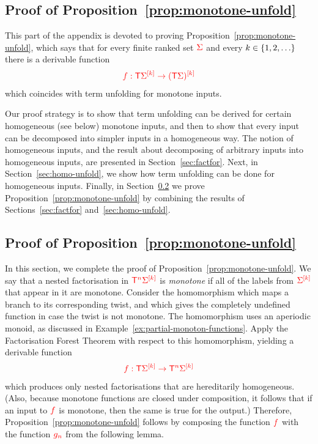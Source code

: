 \subsection{Proof of Proposition~\ref{prop:monotone-unfold}}
This part of the appendix is devoted to proving Proposition~\ref{prop:monotone-unfold}, which says that  for  every finite ranked set $\rSigma$ and every $k \in \set{1,2,\ldots}$ there is a derivable function 
    \begin{align*}
    \ranked{ f : \tmonad \mati k \Sigma \to \mati k {(\tmonad \Sigma)}}
    \end{align*}
    which coincides with term unfolding for monotone inputs.


Our proof strategy is to show that term unfolding can be derived for certain homogeneous (see below) monotone inputs, and then to show that every input can be decomposed into simpler inputs in a homogeneous way. The notion of homogeneous inputs, and the result about  decomposing of arbitrary inputs into homogeneous inputs, are presented in Section~\ref{sec:factfor}. Next, in Section~\ref{sec:homo-unfold}, we show how term unfolding can be done for homogeneous inputs. Finally, in Section~\ref{sec:monotone-unfold-proof} we prove Proposition~\ref{prop:monotone-unfold} by combining  the results of Sections~\ref{sec:factfor} and~\ref{sec:homo-unfold}.




\subsection{Proof of Proposition~\ref{prop:monotone-unfold}}
\label{sec:monotone-unfold-proof}
In this section, we complete the proof of Proposition~\ref{prop:monotone-unfold}.  We say that a nested factorisation in $\tmonadn n \mati k \rSigma$ is \emph{monotone} if all of the labels from $\mati k \rSigma$ that appear in it are monotone. 
Consider the homomorphism which maps a branch to its corresponding twist, and which gives the completely undefined function in case the twist is not monotone.  The homomorphism uses an aperiodic monoid, as discussed in Example~\ref{ex:partial-monoton-functions}. 
 Apply the Factorisation Forest Theorem with respect to this homomorphism, yielding a derivable function
\begin{align*}
\ranked{ f : \tmonad \mati k \rSigma \to \tmonadn n \mati k \rSigma}
\end{align*}
which produces only nested factorisations that are  hereditarily homogeneous. (Also, because monotone functions are closed under composition, it follows that if  an input to $\ranked f$ is monotone, then the same is true for the output.) Therefore,  Proposition~\ref{prop:monotone-unfold} follows by composing the function $\ranked f$ with the function $\ranked {g_n}$ from the following lemma. 

